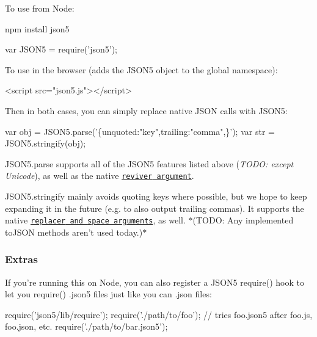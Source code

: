 To use from Node\+:


\begin{DoxyCode}
npm install json5
\end{DoxyCode}



\begin{DoxyCode}
var JSON5 = require('json5');
\end{DoxyCode}


To use in the browser (adds the {\ttfamily J\+S\+O\+N5} object to the global namespace)\+:


\begin{DoxyCode}
<script src="json5.js"></script>
\end{DoxyCode}


Then in both cases, you can simply replace native {\ttfamily J\+S\+ON} calls with {\ttfamily J\+S\+O\+N5}\+:


\begin{DoxyCode}
var obj = JSON5.parse('\{unquoted:"key",trailing:"comma",\}');
var str = JSON5.stringify(obj);
\end{DoxyCode}


{\ttfamily J\+S\+O\+N5.\+parse} supports all of the J\+S\+O\+N5 features listed above ({\itshape T\+O\+DO\+: except Unicode}), as well as the native \href{https://developer.mozilla.org/en-US/docs/Web/JavaScript/Reference/Global_Objects/JSON/parse}{\tt {\ttfamily reviver} argument}.

{\ttfamily J\+S\+O\+N5.\+stringify} mainly avoids quoting keys where possible, but we hope to keep expanding it in the future (e.\+g. to also output trailing commas). It supports the native \href{https://developer.mozilla.org/en-US/docs/Web/JavaScript/Reference/Global_Objects/JSON/stringify}{\tt {\ttfamily replacer} and {\ttfamily space} arguments}, as well. $\ast$(T\+O\+DO\+: Any implemented {\ttfamily to\+J\+S\+ON} methods aren’t used today.)$\ast$

\subsubsection*{Extras}

If you’re running this on Node, you can also register a J\+S\+O\+N5 {\ttfamily require()} hook to let you {\ttfamily require()} {\ttfamily .json5} files just like you can {\ttfamily .json} files\+:


\begin{DoxyCode}
require('json5/lib/require');
require('./path/to/foo');   // tries foo.json5 after foo.js, foo.json, etc.
require('./path/to/bar.json5');
\end{DoxyCode}


